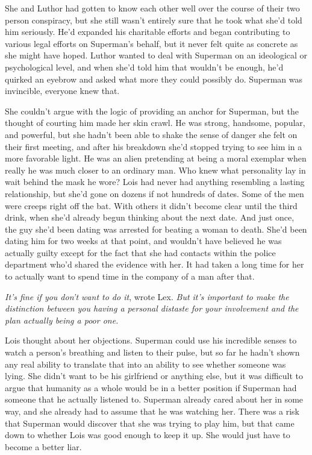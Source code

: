 \documentclass[ebook,12pt]{memoir}
\begin{document}
She and Luthor had gotten to know each other well over the course of
their two person conspiracy, but she still wasn't entirely sure that he
took what she'd told him seriously. He'd expanded his charitable efforts
and began contributing to various legal efforts on Superman's behalf,
but it never felt quite as concrete as she might have hoped. Luthor
wanted to deal with Superman on an ideological or psychological level,
and when she'd told him that wouldn't be enough, he'd quirked an eyebrow
and asked what more they could possibly do. Superman was invincible,
everyone knew that.

She couldn't argue with the logic of providing an anchor for Superman,
but the thought of courting him made her skin crawl. He was strong,
handsome, popular, and powerful, but she hadn't been able to shake the
sense of danger she felt on their first meeting, and after his breakdown
she'd stopped trying to see him in a more favorable light. He was an
alien pretending at being a moral exemplar when really he was much
closer to an ordinary man. Who knew what personality lay in wait behind
the mask he wore? Lois had never had anything resembling a lasting
relationship, but she'd gone on dozens if not hundreds of dates. Some of
the men were creeps right off the bat. With others it didn't become
clear until the third drink, when she'd already begun thinking about the
next date. And just once, the guy she'd been dating was arrested for
beating a woman to death. She'd been dating him for two weeks at that
point, and wouldn't have believed he was actually guilty except for the
fact that she had contacts within the police department who'd shared the
evidence with her. It had taken a long time for her to actually want to
spend time in the company of a man after that.

\emph{It's fine if you don't want to do it}, wrote Lex. \emph{But it's
important to make the distinction between you having a personal distaste
for your involvement and the plan actually being a poor one.}

Lois thought about her objections. Superman could use his incredible
senses to watch a person's breathing and listen to their pulse, but so
far he hadn't shown any real ability to translate that into an ability
to see whether someone was lying. She didn't want to be his girlfriend
or anything else, but it was difficult to argue that humanity as a whole
would be in a better position if Superman had someone that he actually
listened to. Superman already cared about her in some way, and she
already had to assume that he was watching her. There was a risk that
Superman would discover that she was trying to play him, but that came
down to whether Lois was good enough to keep it up. She would just have
to become a better liar.
\end{document}
